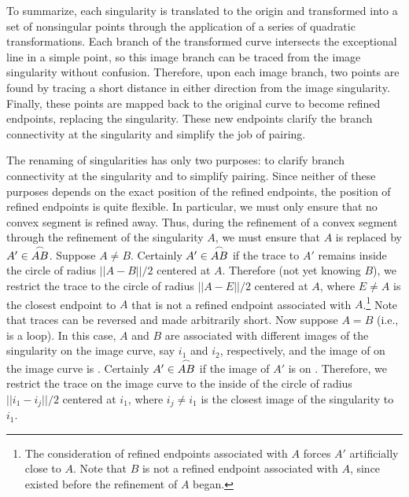 
To summarize, each singularity is translated to the origin and transformed 
into a set of nonsingular points through the application of a series of 
quadratic 
transformations.  Each branch of the transformed curve intersects the 
exceptional line in a simple point, so this image branch can be traced
from the image singularity without confusion.
Therefore, upon each image branch, two points are found by tracing a 
short distance in either direction from the image singularity.
Finally, these points are mapped back to the original curve
to become refined endpoints, replacing the singularity.
These new endpoints clarify the branch connectivity at the singularity
and simplify the job of pairing.


The renaming of singularities has only two purposes: to clarify branch
connectivity at the singularity and to simplify pairing.
Since neither of these purposes depends on the exact position of the 
refined endpoints,
the position of refined endpoints is quite flexible.
\label{page-flex}
In particular, we must only ensure that no convex segment is refined away.
Thus, during the refinement of a convex segment  through 
the refinement
of the singularity $A$, we must ensure that $A$ is replaced by 
$A' \in \mbox{$\stackrel{\frown}{AB}$}$.
Suppose $A \neq B$.
Certainly $A' \in \mbox{$\stackrel{\frown}{AB}$}$ if the trace to $A'$ remains inside
the circle of radius $||A - B||/2$ centered at $A$.
Therefore (not yet knowing $B$), we restrict the trace to the circle
of radius $||A - E||/2$ centered at $A$, where $E \neq A$ is the 
closest endpoint
to $A$ that is not a refined endpoint associated with $A$.\footnote{The 
	consideration of 
	refined endpoints
	associated with $A$ forces $A'$ artificially close to $A$.
	Note that $B$ is not 
	a refined endpoint associated with $A$, since  
	existed before the refinement of $A$ began.}
Note that traces can be reversed and made arbitrarily short.
Now suppose $A = B$ (i.e.,  is a loop).
In this case, $A$ and $B$ are associated with different images 
of the singularity on the image curve, say $i_{1}$ and $i_{2}$, 
respectively, and 
the image of  on the image curve is .
Certainly $A' \in \mbox{$\stackrel{\frown}{AB}$}$ if the image of $A'$ is on .
Therefore, we restrict the trace on the image curve to the
inside of the circle of radius
$||i_{1} - i_{j}||/2$ centered at $i_{1}$, 
where $i_{j} \neq i_{1}$ is the closest image of the singularity to $i_{1}$.

